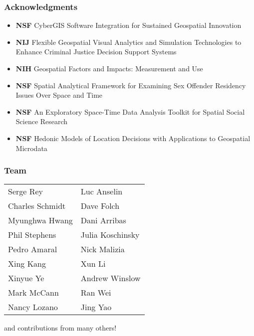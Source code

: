 \documentclass{beamer}
\begin{document}
\begin{frame}\frametitle{Acknowledgments}
\begin{itemize}
  \item \textbf{NSF}  CyberGIS Software Integration for Sustained Geospatial Innovation
  \item \textbf{NIJ}  Flexible Geospatial Visual Analytics and Simulation Technologies to Enhance Criminal Justice Decision Support Systems
  \item \textbf{NIH} Geospatial Factors and Impacts: Measurement and Use 
  \item \textbf{NSF} Spatial Analytical Framework for Examining Sex Offender
    Residency Issues Over Space and Time
  \item \textbf{NSF} An Exploratory Space-Time Data Analysis Toolkit for Spatial Social Science Research 
  \item \textbf{NSF}  Hedonic Models of Location Decisions with Applications to Geospatial Microdata 
\end{itemize}
\end{frame}



\begin{frame}\frametitle{Team}
  \begin{center}
 \begin{tabular}{ll}
Serge Rey& Luc Anselin\\
Charles Schmidt & Dave Folch\\
Myunghwa Hwang& Dani Arribas\\
Phil Stephens&Julia Koschinsky\\
Pedro Amaral&Nick Malizia\\
Xing Kang&Xun Li\\
Xinyue Ye&Andrew Winslow\\
Mark McCann& Ran Wei\\
Nancy Lozano & Jing Yao\\
\end{tabular}
  \end{center}
and contributions from many others!
 
\end{frame}
\end{document}
